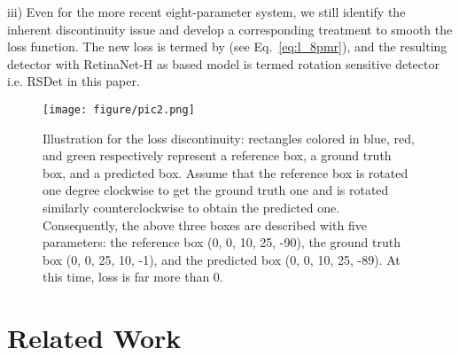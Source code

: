 \documentclass[10pt,twocolumn,letterpaper]{article}
\begin{document}
    iii) Even for the more recent eight-parameter system, we still identify the inherent discontinuity issue and develop a corresponding treatment to smooth the loss function. The new loss is termed by  (see Eq.~\ref{eq:l_8pmr}), and the resulting detector with RetinaNet-H \cite{Yang_2019_ICCV} as based model is termed rotation sensitive detector i.e. RSDet in this paper. 
\begin{figure}[h]
    \begin{center}
        \texttt{[image: figure/pic2.png]}
    \end{center}
    \vspace{-10pt}
    \caption{Illustration for the loss discontinuity: rectangles colored in blue, red, and green respectively represent a reference box, a ground truth box, and a predicted box. Assume that the reference box is rotated one degree clockwise to get the ground truth one and is rotated similarly counterclockwise to obtain the predicted one. Consequently, the above three boxes are described with five parameters: the reference box (0, 0, 10, 25, -90), the ground truth box (0, 0, 25, 10, -1), and the predicted box (0, 0, 10, 25, -89). At this time,  loss is far more than 0.}
    \label{fig:discontinuity_}
    \vspace{-10pt}
\end{figure}

\section{Related Work}
\end{document}
